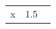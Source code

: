 \documentclass{article}
\begin{document}
\begin{tabular}{@{}lc@{}}
x & 1.5 \
\end{tabular}
\end{document}
